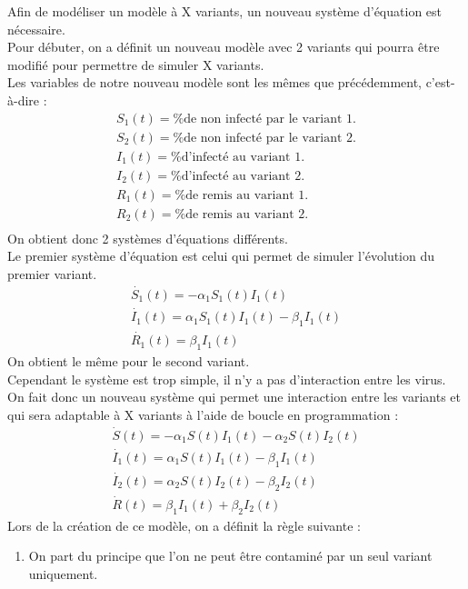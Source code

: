 \documentclass{article}
\begin{document}
Afin de modéliser un modèle à X variants, un nouveau système d'équation est nécessaire.\\ 
Pour débuter, on a définit un nouveau modèle avec 2 variants qui pourra être modifié pour permettre de simuler X variants.\\
\noindent
Les variables de notre nouveau modèle sont les mêmes que précédemment, c'est-à-dire :
\begin{align}
    S_1(t)= \text{\% de non infecté par le variant 1.} \\
    S_2(t)= \text{\% de non infecté par le variant 2.} \\
    I_1(t)= \text{\% d'infecté au variant 1.} \\
    I_2(t)= \text{\% d'infecté au variant 2.} \\
    R_1(t)= \text{\% de remis au variant 1.} \\
    R_2(t)= \text{\% de remis au variant 2.} \\
\end{align}
\noindent
On obtient donc 2 systèmes d'équations différents. \\
\noindent
Le premier système d'équation est celui qui permet de simuler l'évolution du premier variant.\\
\begin{align}
    \dot{S_1}(t)= -\alpha_1 S_1(t)I_1(t) \\
    \dot{I_1}(t)= \alpha_1 S_1(t)I_1(t)-\beta_1 I_1(t) \\
    \dot{R_1}(t)= \beta_1 I_1(t)
\end{align}
On obtient le même pour le second variant. \\
Cependant le système est trop simple, il n'y a pas d'interaction entre les virus. \\
On fait donc un nouveau système qui permet une interaction entre les variants et qui sera adaptable à X variants à l'aide de boucle en programmation :
\begin{align}
    \dot{S}(t)= -\alpha_1 S(t)I_1(t) - \alpha_2 S(t)I_2(t) \\
    \dot{I_1}(t)= \alpha_1 S(t)I_1(t)-\beta_1 I_1(t) \\
    \dot{I_2}(t)= \alpha_2 S(t)I_2(t)-\beta_2 I_2(t) \\
    \dot{R}(t)= \beta_1 I_1(t) + \beta_2 I_2(t)
\end{align}
\noindent
Lors de la création de ce modèle, on a définit la règle suivante : \\
\begin{enumerate}
    \item On part du principe que l'on ne peut être contaminé par un seul variant uniquement. \\
\end{enumerate}
\end{document}
